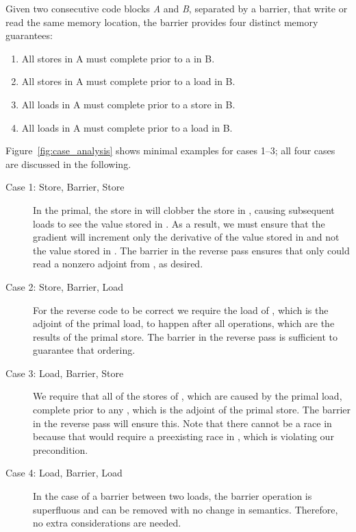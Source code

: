 Given two consecutive code blocks \emph{A} and \emph{B}, separated by a barrier, that write or read the same memory location,
the barrier provides four distinct memory guarantees:
\begin{enumerate}
    \item All stores in A must complete prior to a  in B.
    \item All stores in A must complete prior to a load in B.
    \item All loads in A must complete prior to a store in B.
    \item All loads in A must complete prior to a load in B.
\end{enumerate}

\noindent
Figure~\ref{fig:case_analysis} shows minimal examples for cases 1--3; all four cases are discussed in the following.


\begin{description}
\item[Case 1: Store, Barrier, Store]
In the primal, the store in  will clobber the store in , causing subsequent loads to see the value stored in . 
As a result, we must ensure that the gradient will increment only the derivative of the value stored in  and not the value stored in . 
The barrier in the reverse pass ensures that only  could read a nonzero adjoint from , as desired.

\item[Case 2: Store, Barrier, Load]

For the reverse code to be correct we require  the load of , which is the adjoint of the primal load, to happen after all  operations, which are the results of the primal store.
The barrier in the reverse pass is sufficient to guarantee that ordering.

\item[Case 3: Load, Barrier, Store]
We require that all of the stores of , which are caused by the primal load,
 complete prior to any , which is the adjoint of the primal store.
The barrier in the reverse pass will ensure this.
Note that there cannot be a race in  because that would require a preexisting race in , which is violating our precondition.

\item[Case 4: Load, Barrier, Load]
In the case of a barrier  between two loads, the barrier operation is superfluous and can be removed with no change in semantics.
Therefore, no extra considerations are needed.
\end{description}

